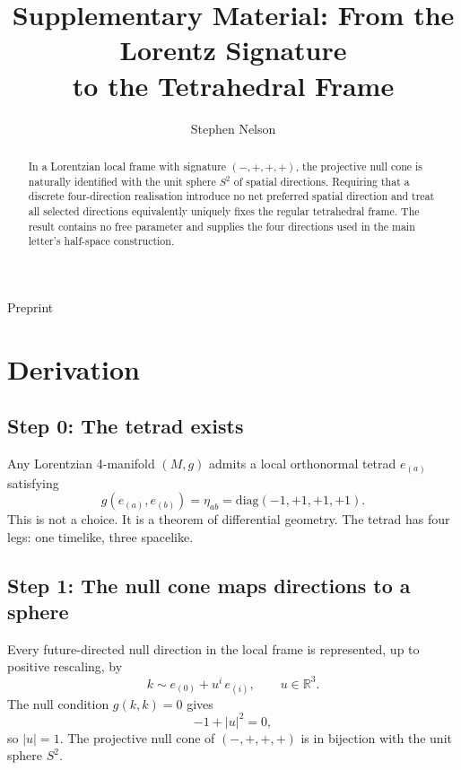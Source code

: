 \documentclass[twocolumn]{iopjournal}
\renewcommand{\articletype}[1]{%
  {\vspace*{-8mm}\noindent \Large \sf Preprint}\par
  \vspace*{6mm}\noindent{\scriptsize \sf{\bfseries \MakeUppercase{#1}}}}
\begin{document}
\articletype{Supplementary Material}

\title{Supplementary Material: From the Lorentz Signature\\to the Tetrahedral Frame}

\author{Stephen Nelson}


\begin{abstract}
In a Lorentzian local frame with signature $(-,+,+,+)$, the projective null cone is naturally identified with the unit sphere $S^2$ of spatial directions. Requiring that a discrete four-direction realisation introduce no net preferred spatial direction and treat all selected directions equivalently uniquely fixes the regular tetrahedral frame. The result contains no free parameter and supplies the four directions used in the main letter's half-space construction.
\end{abstract}


\section*{Derivation}

\subsection*{Step 0: The tetrad exists}

Any Lorentzian 4-manifold $(M, g)$ admits a local orthonormal tetrad $e_{(a)}$ satisfying
\begin{equation}
g(e_{(a)}, e_{(b)}) = \eta_{ab} = \mathrm{diag}(-1,+1,+1,+1).
\end{equation}
This is not a choice. It is a theorem of differential geometry. The tetrad has four legs: one timelike, three spacelike.

\subsection*{Step 1: The null cone maps directions to a sphere}

Every future-directed null direction in the local frame is represented, up to positive rescaling, by
\begin{equation}
k \sim e_{(0)} + u^i\, e_{(i)}, \qquad u \in \mathbb{R}^3.
\end{equation}
The null condition $g(k,k) = 0$ gives
\begin{equation}
-1 + |u|^2 = 0,
\end{equation}
so $|u| = 1$. The projective null cone of $(-,+,+,+)$ is in bijection with the unit sphere $S^2$.
\end{document}
